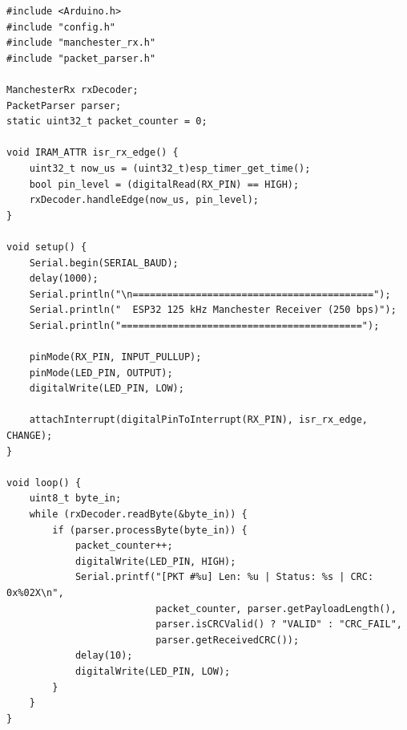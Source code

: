 \begin{lstlisting}[style=customcpp, caption={Bucle principal del firmware receptor (\texttt{firmware\_rx/firmware\_rx.ino})}]
#include <Arduino.h>
#include "config.h"
#include "manchester_rx.h"
#include "packet_parser.h"

ManchesterRx rxDecoder;
PacketParser parser;
static uint32_t packet_counter = 0;

void IRAM_ATTR isr_rx_edge() {
    uint32_t now_us = (uint32_t)esp_timer_get_time();
    bool pin_level = (digitalRead(RX_PIN) == HIGH);
    rxDecoder.handleEdge(now_us, pin_level);
}

void setup() {
    Serial.begin(SERIAL_BAUD);
    delay(1000);
    Serial.println("\n==========================================");
    Serial.println("  ESP32 125 kHz Manchester Receiver (250 bps)");
    Serial.println("==========================================");

    pinMode(RX_PIN, INPUT_PULLUP);
    pinMode(LED_PIN, OUTPUT);
    digitalWrite(LED_PIN, LOW);

    attachInterrupt(digitalPinToInterrupt(RX_PIN), isr_rx_edge, CHANGE);
}

void loop() {
    uint8_t byte_in;
    while (rxDecoder.readByte(&byte_in)) {
        if (parser.processByte(byte_in)) {
            packet_counter++;
            digitalWrite(LED_PIN, HIGH);
            Serial.printf("[PKT #%u] Len: %u | Status: %s | CRC: 0x%02X\n",
                          packet_counter, parser.getPayloadLength(),
                          parser.isCRCValid() ? "VALID" : "CRC_FAIL",
                          parser.getReceivedCRC());
            delay(10);
            digitalWrite(LED_PIN, LOW);
        }
    }
}
\end{lstlisting}
